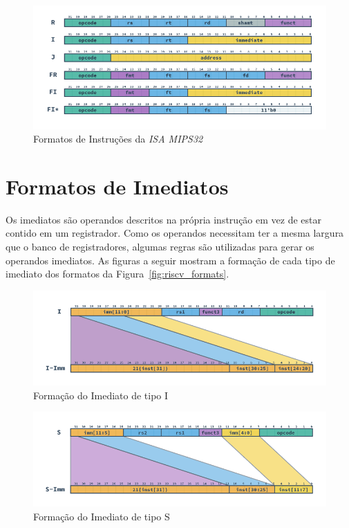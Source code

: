 \begin{figure}[H]
\centering
    \includegraphics[width=1\linewidth]{images/MIPS_Formats.png}
    \caption{Formatos de Instruções da \textit{ISA MIPS32}
        }\label{fig:mips_formats}
\end{figure}

\section{Formatos de Imediatos}
{
    Os imediatos são operandos descritos na própria instrução em vez de estar
    contido em um registrador. Como os operandos necessitam ter a mesma largura
    que o banco de registradores, algumas regras são utilizadas para gerar os
    operandos imediatos. As figuras a seguir mostram a formação de cada tipo de
    imediato dos formatos da Figura~\ref{fig:riscv_formats}.
}

\begin{figure}[H]
\centering
    \includegraphics[width=1\linewidth]{images/RV_I_Imm.png}
    \caption{Formação do Imediato de tipo I
        }\label{fig:riscv_i_imm}
\end{figure}

\begin{figure}[H]
\centering
    \includegraphics[width=1\linewidth]{images/RV_S_Imm.png}
    \caption{Formação do Imediato de tipo S
        }\label{fig:riscv_s_imm}
\end{figure}

